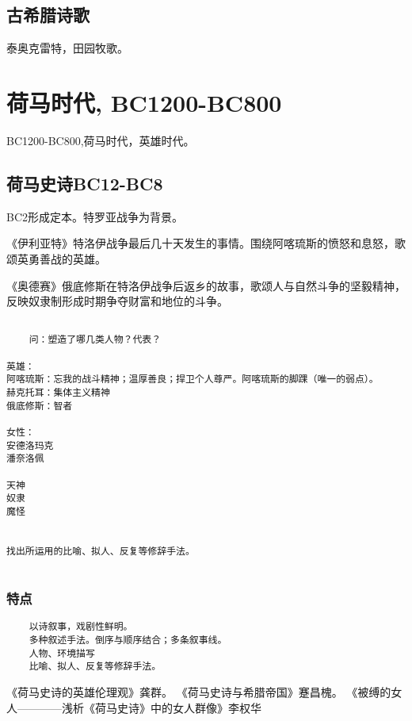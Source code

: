 \documentclass[UTF8]{../../RepresentationUniverse}
\begin{document}
\subsection{古希腊诗歌}

泰奥克雷特，田园牧歌。


\section{荷马时代, BC1200-BC800}
BC1200-BC800,荷马时代，英雄时代。

\subsection{荷马史诗BC12-BC8}






BC2形成定本。特罗亚战争为背景。

《伊利亚特》特洛伊战争最后几十天发生的事情。围绕阿喀琉斯的愤怒和息怒，歌颂英勇善战的英雄。

《奥德赛》俄底修斯在特洛伊战争后返乡的故事，歌颂人与自然斗争的坚毅精神，反映奴隶制形成时期争夺财富和地位的斗争。




\begin{lstlisting}

    问：塑造了哪几类人物？代表？

英雄：
阿喀琉斯：忘我的战斗精神；温厚善良；捍卫个人尊严。阿喀琉斯的脚踝（唯一的弱点）。
赫克托耳：集体主义精神
俄底修斯：智者

女性：
安德洛玛克
潘奈洛佩

天神
奴隶
魔怪


找出所运用的比喻、拟人、反复等修辞手法。
    
\end{lstlisting}


\subsubsection{特点}
\begin{lstlisting}
    以诗叙事，戏剧性鲜明。
    多种叙述手法。倒序与顺序结合；多条叙事线。
    人物、环境描写
    比喻、拟人、反复等修辞手法。
\end{lstlisting}






《荷马史诗的英雄伦理观》龚群。
《荷马史诗与希腊帝国》蹇昌槐。
《被缚的女人————浅析《荷马史诗》中的女人群像》李权华
\end{document}

